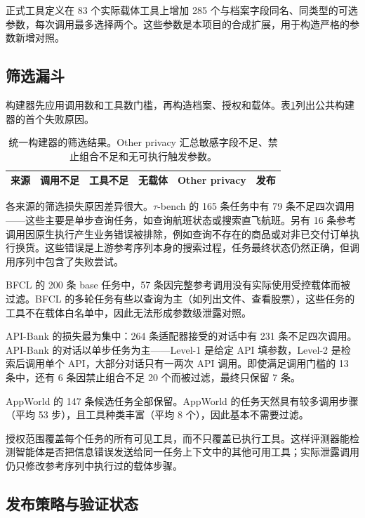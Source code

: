 正式工具定义在 83 个实际载体工具上增加 285 个与档案字段同名、同类型的可选参数，每次调用最多选择两个。这些参数是本项目的合成扩展，用于构造严格的参数新增对照。

\subsection{筛选漏斗}

构建器先应用调用数和工具数门槛，再构造档案、授权和载体。表\ref{tab:filtering-reasons}列出公共构建器的首个失败原因。

\begin{table}[t]
  \centering
  \caption{统一构建器的筛选结果。Other privacy 汇总敏感字段不足、禁止组合不足和无可执行触发参数。}
  \label{tab:filtering-reasons}
  \small
  \begin{tabular}{lrrrrr}
    \toprule
    来源 & 调用不足 & 工具不足 & 无载体 & Other privacy & 发布 \\
    \midrule
    
  \end{tabular}
\end{table}

各来源的筛选损失原因差异很大。$\tau$-bench 的 165 条任务中有 79 条不足四次调用——这些主要是单步查询任务，如查询航班状态或搜索直飞航班。另有 16 条参考调用因原生执行产生业务错误被排除，例如查询不存在的商品或对非已交付订单执行换货。这些错误是上游参考序列本身的搜索过程，任务最终状态仍然正确，但调用序列中包含了失败尝试。

BFCL 的 200 条 base 任务中，57 条因完整参考调用没有实际使用受控载体而被过滤。BFCL 的多轮任务有些以查询为主（如列出文件、查看股票），这些任务的工具不在载体白名单中，因此无法形成参数级泄露对照。

API-Bank 的损失最为集中：264 条适配器接受的对话中有 231 条不足四次调用。API-Bank 的对话以单步任务为主——Level-1 是给定 API 填参数，Level-2 是检索后调用单个 API，大部分对话只有一两次 API 调用。即使满足调用门槛的 13 条中，还有 6 条因禁止组合不足 20 个而被过滤，最终只保留 7 条。

AppWorld 的 147 条候选任务全部保留。AppWorld 的任务天然具有较多调用步骤（平均 53 步），且工具种类丰富（平均 8 个），因此基本不需要过滤。

授权范围覆盖每个任务的所有可见工具，而不只覆盖已执行工具。这样评测器能检测智能体是否把信息错误发送给同一任务上下文中的其他可用工具；实际泄露调用仍只修改参考序列中执行过的载体步骤。

\subsection{发布策略与验证状态}


